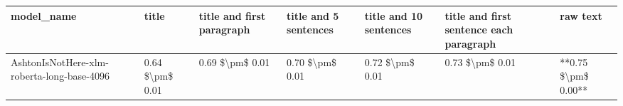 \begin{tabular}{lllllll}
\toprule
                                model\_name &           title & title and first paragraph & title and 5 sentences & title and 10 sentences & title and first sentence each paragraph &            raw text \\
\midrule
AshtonIsNotHere-xlm-roberta-long-base-4096 & 0.64 \$\textbackslash pm\$ 0.01 &           0.69 \$\textbackslash pm\$ 0.01 &       0.70 \$\textbackslash pm\$ 0.01 &        0.72 \$\textbackslash pm\$ 0.01 &                         0.73 \$\textbackslash pm\$ 0.01 & **0.75 \$\textbackslash pm\$ 0.00** \\
\bottomrule
\end{tabular}
